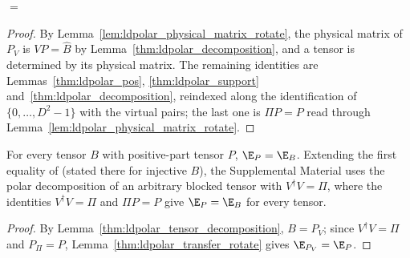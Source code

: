 \begin{center}
    \tenkzkernel
    \begin{tenkz}[rows={wire}, cols=1, bonds=none]
    \end{tenkz}
    \quad $=$ \quad
    \begin{tenkz}[rows={wire,wire}, cols=1, bonds=none, align=2]
    \end{tenkz}
\end{center}
\begin{proof}
    \leanok
    By Lemma~\ref{lem:ldpolar_physical_matrix_rotate}, the physical matrix
    of $P_V$ is $VP=\widehat B$ by Lemma~\ref{thm:ldpolar_decomposition},
    and a tensor is determined by its physical matrix. The remaining
    identities are Lemmas~\ref{thm:ldpolar_pos},
    \ref{thm:ldpolar_support} and~\ref{thm:ldpolar_decomposition},
    reindexed along the identification of $\{0,\dots,D^2-1\}$ with the
    virtual pairs; the last one is $\Pi P=P$ read through
    Lemma~\ref{lem:ldpolar_physical_matrix_rotate}.
\end{proof}

\begin{lemma}
    \label{thm:ldpolar_transfer}
    \leanok
    For every tensor $B$ with positive-part tensor $P$, $\E_P=\E_B$. Extending
    the first equality of \cite[eq.~(8)]{Malz2024Preparation} (stated there for
    injective $B$), the Supplemental Material uses the polar decomposition of
    an arbitrary blocked tensor with $V^\dagger V=\Pi$, where the identities
    $V^\dagger V=\Pi$ and $\Pi P=P$ give $\E_P=\E_B$ for every tensor.
\end{lemma}
\begin{proof}
    \leanok
    By Lemma~\ref{thm:ldpolar_tensor_decomposition}, $B=P_V$; since
    $V^\dagger V=\Pi$ and $P_\Pi=P$, Lemma~\ref{thm:ldpolar_transfer_rotate}
    gives $\E_{P_V}=\E_P$.
\end{proof}

